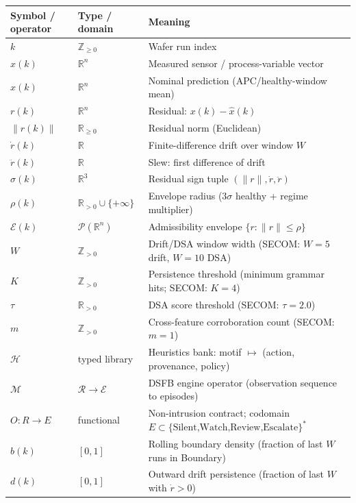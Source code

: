 \documentclass[11pt,letterpaper]{article}
\theoremstyle{scresult}
\begin{document}
\begin{center}
\tiny\renewcommand{\arraystretch}{1.35}
\begin{tabular}{@{}p{3.0cm}p{4.0cm}p{6.2cm}@{}}
\toprule
\textbf{Symbol / operator} & \textbf{Type / domain} & \textbf{Meaning} \\
\midrule
$k$ & $\mathbb{Z}_{\geq 0}$ & Wafer run index \\
$x(k)$ & $\mathbb{R}^n$ & Measured sensor / process-variable vector \\
$\hat{x}(k)$ & $\mathbb{R}^n$ & Nominal prediction (APC/healthy-window mean) \\
$r(k)$ & $\mathbb{R}^n$ & Residual: $x(k)-\hat{x}(k)$ \\
$\|r(k)\|$ & $\mathbb{R}_{\geq 0}$ & Residual norm (Euclidean) \\
$\dot{r}(k)$ & $\mathbb{R}$ & Finite-difference drift over window $W$ \\
$\ddot{r}(k)$ & $\mathbb{R}$ & Slew: first difference of drift \\
$\sigma(k)$ & $\mathbb{R}^3$ & Residual sign tuple $(\|r\|,\dot{r},\ddot{r})$ \\
$\rho(k)$ & $\mathbb{R}_{>0}\cup\{+\infty\}$ & Envelope radius ($3\sigma$ healthy + regime multiplier) \\
$\mathcal{E}(k)$ & $\mathcal{P}(\mathbb{R}^n)$ & Admissibility envelope $\{r:\|r\|\leq\rho\}$ \\
$W$ & $\mathbb{Z}_{>0}$ & Drift/DSA window width (SECOM: $W\!=\!5$ drift, $W\!=\!10$ DSA) \\
$K$ & $\mathbb{Z}_{>0}$ & Persistence threshold (minimum grammar hits; SECOM: $K\!=\!4$) \\
$\tau$ & $\mathbb{R}_{>0}$ & DSA score threshold (SECOM: $\tau\!=\!2.0$) \\
$m$ & $\mathbb{Z}_{>0}$ & Cross-feature corroboration count (SECOM: $m\!=\!1$) \\
$\mathcal{H}$ & typed library & Heuristics bank: motif $\mapsto$ (action, provenance, policy) \\
$\mathcal{M}$ & $\mathcal{R}\to\mathcal{E}$ & DSFB engine operator (observation sequence to episodes) \\
$O: R\to E$ & functional & Non-intrusion contract; codomain $E\subset\{\text{Silent,Watch,Review,Escalate}\}^*$ \\
$b(k)$ & $[0,1]$ & Rolling boundary density (fraction of last $W$ runs in Boundary) \\
$d(k)$ & $[0,1]$ & Outward drift persistence (fraction of last $W$ with $\dot{r}>0$) \\

\end{tabular}
\end{center}
\end{document}
